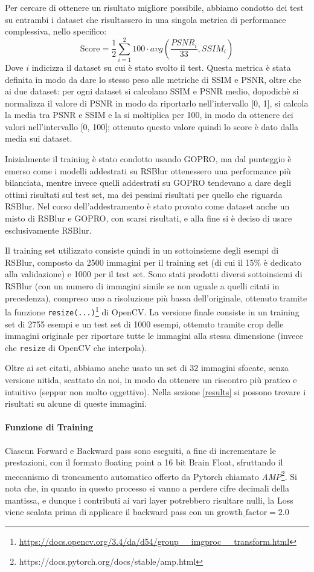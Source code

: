\documentclass[a4paper,10pt,twocolumn]{article}
\begin{document}
Per cercare di ottenere un risultato migliore possibile, abbiamo condotto dei test su entrambi i dataset che risultassero in una singola metrica di performance complessiva, nello specifico:
\[ \text{Score} = \frac{1}{2}\sum_{i=1}^2 100 \cdot avg(\frac{PSNR_i}{33}, SSIM_i)\]
Dove $i$ indicizza il dataset su cui è stato svolto il test. Questa metrica è stata definita in modo da dare lo stesso peso alle metriche di SSIM e PSNR, oltre che ai due dataset: per ogni dataset si calcolano SSIM e PSNR medio, dopodichè si normalizza
il valore di PSNR in modo da riportarlo nell'intervallo [0, 1], si calcola la media tra PSNR e SSIM e la si moltiplica per 100, in modo da ottenere dei valori nell'intervallo [0, 100]; ottenuto questo valore quindi lo score è dato dalla media sui dataset.

Inizialmente il training è stato condotto usando GOPRO, ma dal punteggio è emerso come i modelli addestrati su RSBlur ottenessero una performance più bilanciata, mentre invece quelli addestrati su GOPRO tendevano a dare degli ottimi risultati sul test set, ma dei pessimi
risultati per quello che riguarda RSBlur. Nel corso dell'addestramento è stato provato come dataset anche un misto di RSBlur e GOPRO, con scarsi risultati, e alla fine si è deciso di usare esclusivamente RSBlur.

Il training set utilizzato consiste quindi in un sottoinsieme degli esempi di RSBlur, composto da 2500 immagini per il training set (di cui il 15\% è dedicato alla validazione) e 1000 per il test set. Sono stati prodotti diversi sottoinsiemi di RSBlur (con un numero di immagini
simile se non uguale a quelli citati in precedenza), compreso uno a risoluzione più bassa dell'originale, ottenuto tramite la funzione \texttt{resize(...)}\footnote{\url{https://docs.opencv.org/3.4/da/d54/group__imgproc__transform.html}} di OpenCV.
La versione finale consiste in un training set di 2755 esempi e un test set di 1000 esempi, ottenuto tramite crop delle immagini originale per riportare tutte le immagini alla stessa dimensione (invece che \texttt{resize} di OpenCV che interpola).

Oltre ai set citati, abbiamo anche usato un set di 32 immagini sfocate, senza versione nitida, scattato da noi, in modo da ottenere un riscontro più pratico e intuitivo (seppur non molto oggettivo). Nella sezione \ref{results} si possono trovare i risultati su alcune di queste immagini.

\paragraph{Funzione di Training}
Ciascun Forward e Backward pass sono eseguiti, a fine di incrementare le prestazioni, con il formato floating point a 16 bit Brain Float,
sfruttando il meccanismo di troncamento automatico offerto da Pytorch chiamato \textit{AMP}\footnote{https://docs.pytorch.org/docs/stable/amp.html}.
Si nota che, in quanto in questo processo si vanno a perdere cifre decimali della mantissa, e dunque i contributi ai vari layer potrebbero risultare nulli,
la Loss viene scalata prima di applicare il backward pass con un $\mathrm{growth\_factor} = 2.0$
\end{document}
